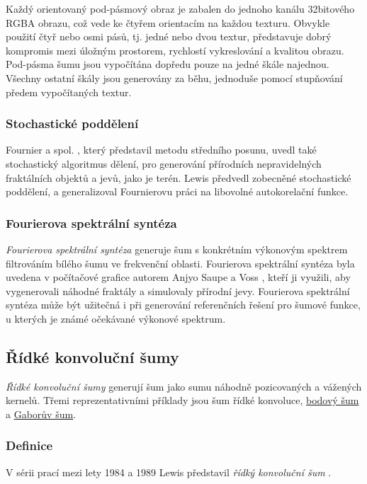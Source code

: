 Každý orientovaný pod-pásmový obraz je zabalen do jednoho kanálu 32bitového RGBA obrazu, což vede ke čtyřem orientacím na každou texturu. Obvykle použití čtyř nebo osmi pásů, tj. jedné nebo dvou textur, představuje dobrý kompromis mezi úložným prostorem, rychlostí vykreslování a kvalitou obrazu. Pod-pásma šumu jsou vypočítána dopředu pouze na jedné škále najednou. Všechny ostatní škály jsou generovány za běhu, jednoduše pomocí stupňování předem vypočítaných textur. \cite{Lagae10}

\subsubsection{Stochastické poddělení}
Fournier a spol. \cite{Fournier98}, který představil metodu středního posunu, uvedl také stochastický algoritmus dělení, pro generování přírodních nepravidelných fraktálních objektů a jevů, jako je terén. Lewis \cite{Lewis86,Lewis87} předvedl zobecněné stochastické poddělení, a generalizoval Fournierovu práci na libovolné autokorelační funkce.

\subsubsection{Fourierova spektrální syntéza}
\label{Fourier}
\textit{Fourierova spektrální syntéza} generuje šum s konkrétním výkonovým spektrem filtrováním bílého šumu ve frekvenční oblasti. Fourierova spektrální syntéza byla uvedena v počítačové grafice autorem Anjyo \cite{Anjyo88} Saupe a Voss \cite{Saupe1988}, kteří ji využili, aby vygenerovali náhodné fraktály a simulovaly přírodní jevy. Fourierova spektrální syntéza může být užitečná i při generování referenčních řešení pro šumové funkce, u kterých je známé očekávané výkonové spektrum.

\subsection{Řídké konvoluční šumy}
\label{SparseNoises}
\textit{Řídké konvoluční šumy} generují šum jako sumu náhodně pozicovaných a vážených kernelů. Třemi reprezentativními příklady jsou šum řídké konvoluce, \hyperref[SpotNoise]{bodový šum} a \hyperref[GaborNoise]{Gaborův šum}.

\subsubsection{Definice}
V sérii prací mezi lety 1984 a 1989 Lewis představil \textit{řídký konvoluční šum} \cite{Lewis84, Lewis86, Lewis89}.

